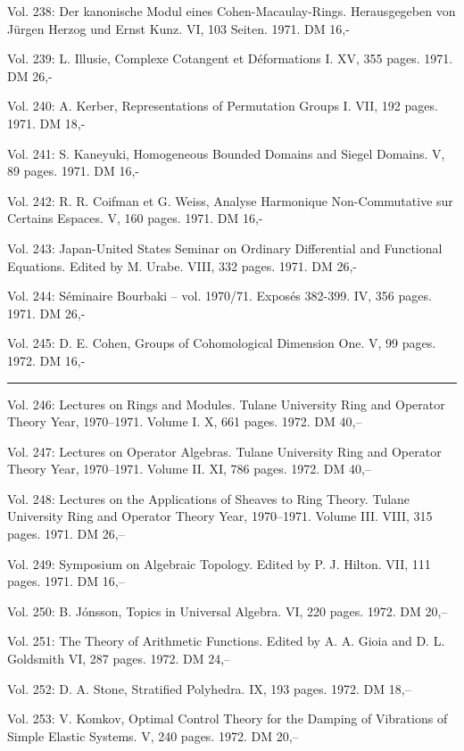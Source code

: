Vol. 238: Der kanonische Modul eines Cohen-Macaulay-Rings. Herausgegeben von Jürgen Herzog und Ernst Kunz. VI, 103 Seiten. 1971. DM 16,-

Vol. 239: L. Illusie, Complexe Cotangent et Déformations I. XV, 355 pages. 1971. DM 26,-

Vol. 240: A. Kerber, Representations of Permutation Groups I. VII, 192 pages. 1971. DM 18,-

Vol. 241: S. Kaneyuki, Homogeneous Bounded Domains and Siegel Domains. V, 89 pages. 1971. DM 16,-

Vol. 242: R. R. Coifman et G. Weiss, Analyse Harmonique Non-Commutative sur Certains Espaces. V, 160 pages. 1971. DM 16,-

Vol. 243: Japan-United States Seminar on Ordinary Differential and Functional Equations. Edited by M. Urabe. VIII, 332 pages. 1971. DM 26,-

Vol. 244: Séminaire Bourbaki -- vol. 1970/71. Exposés 382-399. IV, 356 pages. 1971. DM 26,-

Vol. 245: D. E. Cohen, Groups of Cohomological Dimension One. V, 99 pages. 1972. DM 16,-



\noindent\rule{\linewidth}{0.4pt}

Vol. 246: Lectures on Rings and Modules. Tulane University Ring and Operator Theory Year, 1970--1971. Volume I. X, 661 pages. 1972. DM 40,--

Vol. 247: Lectures on Operator Algebras. Tulane University Ring and Operator Theory Year, 1970--1971. Volume II. XI, 786 pages. 1972. DM 40,--

Vol. 248: Lectures on the Applications of Sheaves to Ring Theory. Tulane University Ring and Operator Theory Year, 1970--1971. Volume III. VIII, 315 pages. 1971. DM 26,--

Vol. 249: Symposium on Algebraic Topology. Edited by P. J. Hilton. VII, 111 pages. 1971. DM 16,--

Vol. 250: B. Jónsson, Topics in Universal Algebra. VI, 220 pages. 1972. DM 20,--

Vol. 251: The Theory of Arithmetic Functions. Edited by A. A. Gioia and D. L. Goldsmith VI, 287 pages. 1972. DM 24,--

Vol. 252: D. A. Stone, Stratified Polyhedra. IX, 193 pages. 1972. DM 18,--

Vol. 253: V. Komkov, Optimal Control Theory for the Damping of Vibrations of Simple Elastic Systems. V, 240 pages. 1972. DM 20,--

